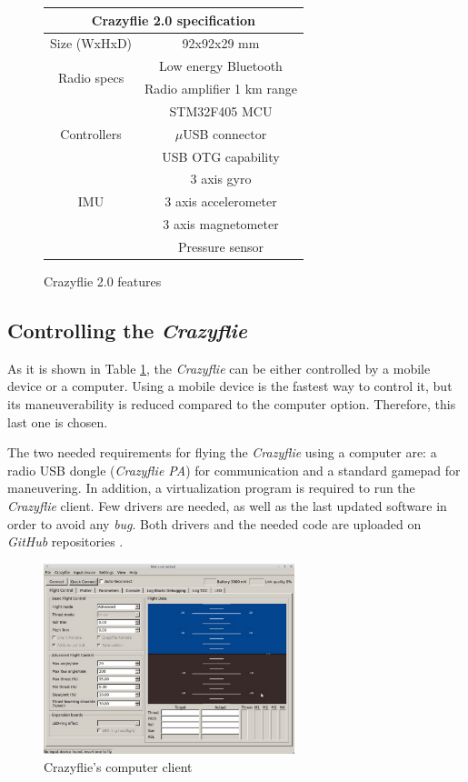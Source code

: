 \begin{figure}[htb]
\begin{center}
\begin{tabular}{|c|c|}

  \hline
  \multicolumn{2}{|c|}{\bf{Crazyflie 2.0 specification}} \\
  \hline
  \hline
  Size (WxHxD)  & 92x92x29 mm \\ \hline
  \multirow{2}{*}{Radio specs} 
   &  Low energy Bluetooth\\
   &  Radio amplifier 1 km range \\ \hline
  \multirow{3}{*}{Controllers} 
   &  STM32F405 MCU\\
   &  $\mu$USB connector \\
   &  USB OTG capability \\ \hline
  \multirow{3}{*}{IMU} 
   &  3 axis gyro \\
   &  3 axis accelerometer \\
   &  3 axis magnetometer \\
   &  Pressure sensor \\
  \hline

\end{tabular}
\caption{Crazyflie 2.0 features}
\label{F:crazyflieFeatures}
\end{center}
\end{figure}


    \subsection{Controlling the \textit{Crazyflie}}
As it is shown in Table \ref{F:crazyflieFeatures}, the \textit{Crazyflie} can be either controlled by a mobile device or a computer. Using a mobile device is the fastest way to control it, but its maneuverability is reduced compared to the computer option. Therefore, this last one is chosen.

The two needed requirements for flying the \textit{Crazyflie} using a computer are: a radio USB dongle (\textit{Crazyflie PA}) for communication and a standard gamepad for maneuvering. In addition, a virtualization program is required to run the \textit{Crazyflie} client. Few drivers are needed, as well as the last updated software in order to avoid any \textit{bug}. Both drivers and the needed code are uploaded on \textit{GitHub} repositories \cite{github}. 

\begin{figure}[H]
\centering
\includegraphics[width=0.65\textwidth]{./images/virtual}
\caption{Crazyflie's computer client}
\end{figure}



